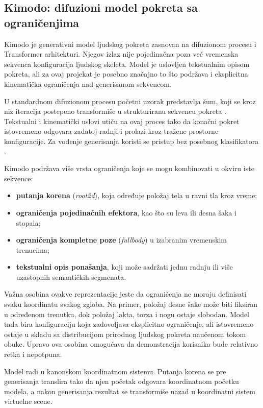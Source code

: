 \documentclass{article}
\begin{document}
\subsection{Kimodo: difuzioni model pokreta sa ograničenjima}

Kimodo \cite{rempe2026kimodo} je generativni model ljudskog pokreta zasnovan na difuzionom procesu i Transformer arhitekturi. Njegov izlaz nije pojedinačna poza već vremenska sekvenca konfiguracija ljudskog skeleta. Model je uslovljen tekstualnim opisom pokreta, ali za ovaj projekat je posebno značajno to što podržava i eksplicitna kinematička ograničenja nad generisanom sekvencom.

U standardnom difuzionom procesu početni uzorak predstavlja šum, koji se kroz niz iteracija postepeno transformiše u strukturiranu sekvencu pokreta \cite{ho2020denoisingdiffusionprobabilisticmodels}. Tekstualni i kinematički uslovi utiču na ovaj proces tako da konačni pokret istovremeno odgovara zadatoj radnji i prolazi kroz tražene prostorne konfiguracije. Za vođenje generisanja koristi se pristup bez posebnog klasifikatora \cite{ho2022classifierfreediffusionguidance}.

Kimodo podržava više vrsta ograničenja koje se mogu kombinovati u okviru iste sekvence:
\begin{itemize}
    \item \textbf{putanja korena} (\textit{root2d}), koja određuje položaj tela u ravni tla kroz vreme;
    \item \textbf{ograničenja pojedinačnih efektora}, kao što su leva ili desna šaka i stopala;
    \item \textbf{ograničenja kompletne poze} (\textit{fullbody}) u izabranim vremenskim trenucima;
    \item \textbf{tekstualni opis ponašanja}, koji može sadržati jednu radnju ili više uzastopnih semantičkih segmenata.
\end{itemize}

Važna osobina ovakve reprezentacije jeste da ograničenja ne moraju definisati svaku koordinatu svakog zgloba. Na primer, položaj desne šake može biti fiksiran u određenom trenutku, dok položaj lakta, torza i nogu ostaje slobodan. Model tada bira konfiguraciju koja zadovoljava eksplicitno ograničenje, ali istovremeno ostaje u skladu sa distribucijom prirodnog ljudskog pokreta naučenom tokom obuke. Upravo ova osobina omogućava da demonstracija korisnika bude relativno retka i nepotpuna.

Model radi u kanonskom koordinatnom sistemu. Putanja korena se pre generisanja translira tako da njen početak odgovara koordinatnom početku modela, a nakon generisanja rezultat se transformiše nazad u koordinatni sistem virtuelne scene.
\end{document}
